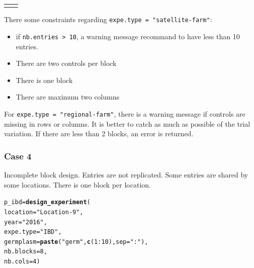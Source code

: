 \documentclass{book}\usepackage[]{graphicx}\usepackage[]{color}
\makeatletter
\newcommand{\hlnum}[1]{\textcolor[rgb]{0.686,0.059,0.569}{#1}}%
\newcommand{\hlstr}[1]{\textcolor[rgb]{0.192,0.494,0.8}{#1}}%
\newcommand{\hlopt}[1]{\textcolor[rgb]{0,0,0}{#1}}%
\newcommand{\hlstd}[1]{\textcolor[rgb]{0.345,0.345,0.345}{#1}}%
\newcommand{\hlkwb}[1]{\textcolor[rgb]{0.69,0.353,0.396}{#1}}%
\newcommand{\hlkwc}[1]{\textcolor[rgb]{0.333,0.667,0.333}{#1}}%
\newcommand{\hlkwd}[1]{\textcolor[rgb]{0.737,0.353,0.396}{\textbf{#1}}}%
\newenvironment{kframe}{%
 \def\at@end@of@kframe{}%
 \ifinner\ifhmode%
  \def\at@end@of@kframe{\end{minipage}}%
  \begin{minipage}{\columnwidth}%
 \fi\fi%
 \def\FrameCommand##1{\hskip\@totalleftmargin \hskip-\fboxsep
 \colorbox{shadecolor}{##1}\hskip-\fboxsep
     \hskip-\linewidth \hskip-\@totalleftmargin \hskip\columnwidth}%
 \MakeFramed {\advance\hsize-\width
   \@totalleftmargin\z@ \linewidth\hsize
   \@setminipage}}%
 {\par\unskip\endMakeFramed%
 \at@end@of@kframe}
\newenvironment{knitrout}{}{} %
\makeatother
\begin{document}
\begin{center}
\begin{tabular}{cc}
\begin{knitrout}
{}



\end{knitrout}
\\
\end{tabular}
\end{center}

There some constraints regarding \texttt{expe.type = "satellite-farm"}:
\begin{itemize}
\item if \texttt{nb.entries > 10}, a warning message recommand to have less than 10 entries.
\item There are two controls per block
\item There is one block
\item There are maximum two columns
\end{itemize}

For \texttt{expe.type = "regional-farm"}, there is a warning message if controls are missing in rows or columns.
It is better to catch as much as possible of the trial variation.
If there are less than 2 blocks, an error is returned.

\subsubsection{Case 4}

Incomplete block design.
Entries are not replicated. Some entries are shared by some locations.
There is one block per location.

\begin{knitrout}
\color{fgcolor}\begin{kframe}
\begin{alltt}
\hlstd{p_ibd} \hlkwb{=} \hlkwd{design_experiment}\hlstd{(}
  \hlkwc{location} \hlstd{=} \hlstr{"Location-9"}\hlstd{,}
  \hlkwc{year} \hlstd{=} \hlstr{"2016"}\hlstd{,}
  \hlkwc{expe.type} \hlstd{=} \hlstr{"IBD"}\hlstd{,}
  \hlkwc{germplasm} \hlstd{=} \hlkwd{paste}\hlstd{(}\hlstr{"germ"}\hlstd{,} \hlkwd{c}\hlstd{(}\hlnum{1}\hlopt{:}\hlnum{10}\hlstd{),} \hlkwc{sep} \hlstd{=} \hlstr{":"}\hlstd{),}
  \hlkwc{nb.blocks} \hlstd{=} \hlnum{8}\hlstd{,}
  \hlkwc{nb.cols} \hlstd{=} \hlnum{4}\hlstd{)}
\end{alltt}
\end{kframe}
\end{knitrout}
\end{document}
